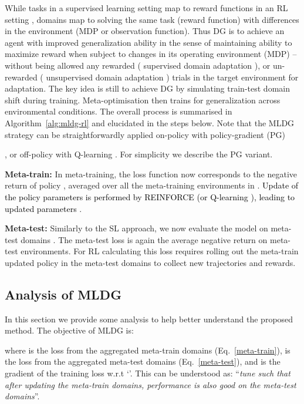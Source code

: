 \documentclass[letterpaper]{article} \usepackage{aaai18}  \usepackage{times}  \usepackage{helvet}  \usepackage{courier}  \usepackage{url}  \usepackage{graphicx}  \usepackage{amsmath}
\newcommand{\keypoint}[1]{\vspace{0.1cm}\noindent\textbf{#1}\quad}
\begin{document}
While tasks in a supervised learning setting map to reward functions in an RL setting \cite{finn2017model}, domains map to solving the same task (reward function) with differences in the environment (MDP or observation function). Thus DG is to achieve an agent with improved generalization ability in the sense of maintaining ability to maximize reward when subject to changes in its operating environment (MDP) --  without being allowed any rewarded ( supervised domain adaptation \cite{finn2017model,ammar2014pgella}), or un-rewarded ( unsupervised domain adaptation \cite{finn2017sslRL,ammar2015unsupTransferPGRL}) trials in the target environment for adaptation. 
The key idea is still to achieve DG by simulating train-test domain shift during training. Meta-optimisation then trains for generalization across environmental conditions. The overall process is summarised in Algorithm~\ref{alg:mldg-rl} and elucidated in the steps below. Note that the MLDG strategy can be straightforwardly applied on-policy with policy-gradient (PG) {\cite{williams1992reinforce}, or off-policy with Q-learning \cite{mnih2015dqn}. For simplicity we describe the PG variant.



\keypoint{Meta-train:} In meta-training, the loss function  now corresponds to the negative return  of policy , averaged over all the meta-training environments in . \textcolor{black}{Update of the policy parameters   is performed by REINFORCE \cite{williams1992reinforce} (or Q-learning \cite{mnih2015dqn}), leading to updated parameters }.

\keypoint{Meta-test:} Similarly to the SL approach, we now evaluate the model on  meta-test domains . The meta-test loss  is again the average negative return on meta-test environments. For RL calculating this loss requires rolling out the meta-train updated policy  in the meta-test domains to collect new trajectories and rewards. 









\subsection{Analysis of MLDG}
In this section we provide some analysis to help better understand the proposed  method. The objective of MLDG is:

where  is the loss from the aggregated meta-train domains (Eq.~\ref{meta-train}),   is the loss from the aggregated meta-test domains (Eq.~\ref{meta-test}), and  is the gradient of the training loss  w.r.t `'.
This can be understood as: ``\emph{tune such that after updating the meta-train domains, performance is also good on the meta-test domains}''. 

}
\end{document}
